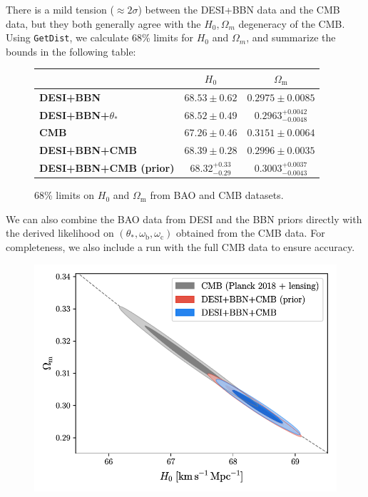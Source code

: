 \documentclass{lkx_paper}
\renewcommand{\b}{{\mathrm{b}}}
\renewcommand{\c}{{\mathrm{c}}}
\newcommand{\m}{{\mathrm{m}}}
\begin{document}
There is a mild tension ($\approx 2\sigma$) between the DESI+BBN data and the CMB data, but they both generally agree with the $H_0, \Omega_m$ degeneracy of the CMB. Using \texttt{GetDist}, we calculate 68\% limits for $H_0$ and $\Omega_m$, and summarize the bounds in the following table:

\begin{figure}[ht]
  \renewcommand{\arraystretch}{1.2}
  \centering
\begin{tabular}{lcc}
  \hline
  \hline
  &$H_0$ & $\Omega_\m$\\
  \hline
  \textbf{DESI+BBN} & $68.53\pm 0.62$ & $0.2975\pm 0.0085$\\
  \textbf{DESI+BBN+$\theta_*$} & $68.52\pm 0.49$ & $0.2963^{+0.0042}_{-0.0048}$\\
  \hline
  \textbf{CMB} & $67.26\pm 0.46$ & $0.3151\pm 0.0064$\\
  \textbf{DESI+BBN+CMB} & $68.39\pm 0.28$ & $0.2996\pm 0.0035$\\
  \textbf{DESI+BBN+CMB (prior)} & $68.32^{+0.33}_{-0.29}$ & $0.3003^{+0.0037}_{-0.0043}$\\
  \hline
  \hline
\end{tabular}
\medskip
\caption{68\% limits on $H_0$ and $\Omega_\m$ from BAO and CMB datasets.}
\end{figure}

We can also combine the BAO data from DESI and the BBN priors directly with the derived likelihood on $(\theta_*, \omega_\b, \omega_\c)$ obtained from the CMB data. For completeness, we also include a run with the full CMB data to ensure accuracy.

\begin{figure}[H]
  \centering
  \includegraphics[scale=0.8]{figures/DESI-CMB-H0-omegam.pdf}
\end{figure}
\end{document}
